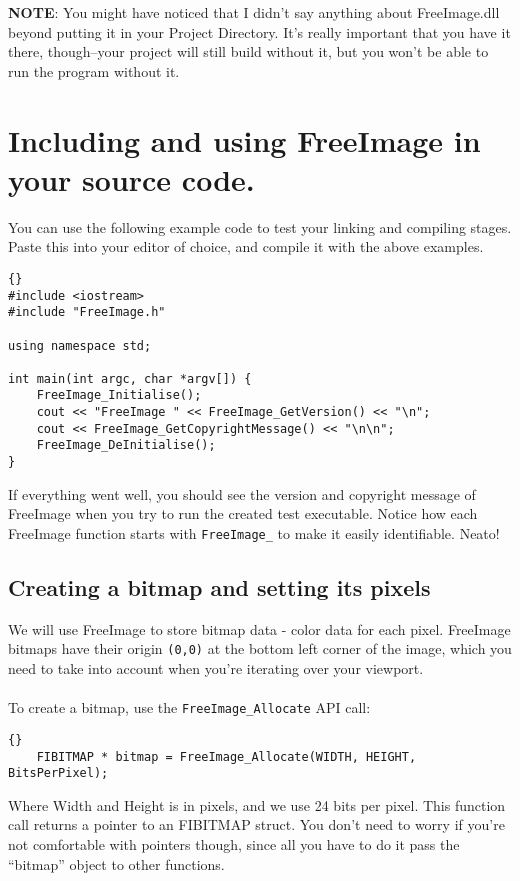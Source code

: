 \documentclass[]{article}
\begin{document}
\textbf{NOTE}: You might have noticed that I didn't say anything about FreeImage.dll beyond putting it in your Project Directory. It's really important that you have it there, though--your project will still build without it, but you won't be able to run the program without it.

\section{Including and using FreeImage in your source code.}\label{usingFree}

You can use the following example code to test your linking and compiling stages. Paste this into your editor of choice, and compile it with the above examples.

\lstset{language=c++}
\lstset{commentstyle=\textit}
\begin{lstlisting}[frame=TRBL,caption=test.cpp : Simple FreeImage test code,label=lstSimple]{}
#include <iostream>
#include "FreeImage.h"

using namespace std;

int main(int argc, char *argv[]) {
	FreeImage_Initialise();	
	cout << "FreeImage " << FreeImage_GetVersion() << "\n";
	cout << FreeImage_GetCopyrightMessage() << "\n\n";
	FreeImage_DeInitialise();
}
\end{lstlisting}

If everything went well, you should see the version and copyright message of FreeImage when you try to run the created test executable. Notice how each FreeImage function starts with \verb=FreeImage_= to make it easily identifiable. Neato!

\subsection{Creating a bitmap and setting its pixels}

We will use FreeImage to store bitmap data - color data for each pixel. FreeImage bitmaps have their origin \verb=(0,0)= at the bottom left corner of the image, which you need to take into account when you're iterating over your viewport.
\\
\\
To create a bitmap, use the \verb=FreeImage_Allocate= API call:

\lstset{language=c++}
\lstset{commentstyle=\textit}
\begin{lstlisting}[frame=trbl]{}
    FIBITMAP * bitmap = FreeImage_Allocate(WIDTH, HEIGHT, BitsPerPixel);
\end{lstlisting}
Where Width and Height is in pixels, and we use 24 bits per pixel. This function call returns a pointer to an FIBITMAP struct. You don't need to worry if you're not comfortable with pointers though, since all you have to do it pass the ``bitmap'' object to other functions.
\end{document}

